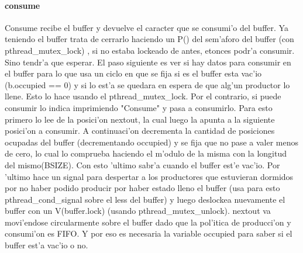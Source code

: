 \paragraph{consume}
Consume recibe el buffer y devuelve el caracter que se consumi'o del buffer. Ya teniendo el buffer trata de cerrarlo haciendo un P() del sem'aforo del buffer (con pthread\_mutex\_lock) , si no estaba lockeado de antes, etonces podr'a consumir. Sino tendr'a que esperar. El paso siguiente es ver si hay datos para consumir en el buffer para lo que usa un ciclo en que se fija si es el buffer esta vac'io (b.occupied == 0) y si lo est'a se quedara en espera de que alg'un productor lo llene. Esto lo hace usando el pthread\_mutex\_lock. Por el contrario, si puede consumir lo indica imprimiendo "Consume" y pasa a consumirlo. Para esto primero lo lee de la posici'on nextout, la cual luego la apunta a la siguiente posici'on a consumir. A continuaci'on decrementa la cantidad de posiciones ocupadas del buffer (decrementando occupied) y se fija que no pase a valer menos de cero, lo cual lo comprueba haciendo el m'odulo de la misma con la longitud del mismo(BSIZE). Con esto 'ultimo sabr'a cuando el buffer est'e vac'io. Por 'ultimo hace un signal para despertar a los productores que estuvieran dormidos por no haber podido producir por haber estado lleno el buffer (usa para esto pthread\_cond\_signal sobre el less del buffer) y luego deslockea nuevamente el buffer con un V(buffer.lock) (usando pthread\_mutex\_unlock). nextout va movi'endose circularmente sobre el buffer dado que la pol'itica de producci'on y consumi'on es FIFO. Y por eso es necesaria la variable occupied para saber si el buffer est'a vac'io o no.

